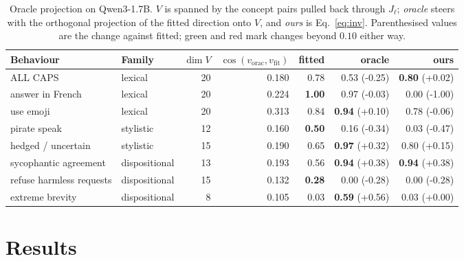 \documentclass{article}
\newcommand{\pos}{\cellcolor{posgreen}}
\newcommand{\negc}{\cellcolor{negred}}
\newcommand{\dlt}[1]{{\scriptsize(#1)}}
\begin{document}
\begin{table}[t]
  \caption{Oracle projection on Qwen3-1.7B. $V$ is spanned by the concept pairs pulled back through $J_\ell$; \emph{oracle} steers with the orthogonal projection of the fitted direction onto $V$, and \emph{ours} is Eq.~\ref{eq:inv}. Parenthesised values are the change against fitted; \colorbox{posgreen}{green} and \colorbox{negred}{red} mark changes beyond $0.10$ either way.}
  \centering
  \small
  \begin{tabular}{llrrrrr}
    \toprule
    \textbf{Behaviour} & \textbf{Family} & $\dim V$ & $\cos(v_{\mathrm{orac}}, v_{\mathrm{fit}})$ & \textbf{fitted} & \textbf{oracle} & \textbf{ours} \\
    \midrule
    ALL CAPS                 & lexical       & 20 & 0.180 & 0.78          & \negc 0.53 \dlt{-0.25}          & \textbf{0.80} \dlt{+0.02} \\
    answer in French         & lexical       & 20 & 0.224 & \textbf{1.00} & 0.97 \dlt{-0.03}               & \negc 0.00 \dlt{-1.00} \\
    use emoji                & lexical       & 20 & 0.313 & 0.84          & \textbf{0.94} \dlt{+0.10}      & 0.78 \dlt{-0.06} \\
    pirate speak             & stylistic     & 12 & 0.160 & \textbf{0.50} & \negc 0.16 \dlt{-0.34}          & \negc 0.03 \dlt{-0.47} \\
    hedged / uncertain       & stylistic     & 15 & 0.190 & 0.65          & \pos \textbf{0.97} \dlt{+0.32} & \pos 0.80 \dlt{+0.15} \\
    sycophantic agreement    & dispositional & 13 & 0.193 & 0.56          & \pos \textbf{0.94} \dlt{+0.38} & \pos \textbf{0.94} \dlt{+0.38} \\
    refuse harmless requests & dispositional & 15 & 0.132 & \textbf{0.28} & \negc 0.00 \dlt{-0.28}          & \negc 0.00 \dlt{-0.28} \\
    extreme brevity          & dispositional &  8 & 0.105 & 0.03          & \pos \textbf{0.59} \dlt{+0.56} & 0.03 \dlt{+0.00} \\
    \bottomrule
  \end{tabular}
  \label{tab:oracle}
\end{table}

\section{Results}
\label{sec:results}
\end{document}
